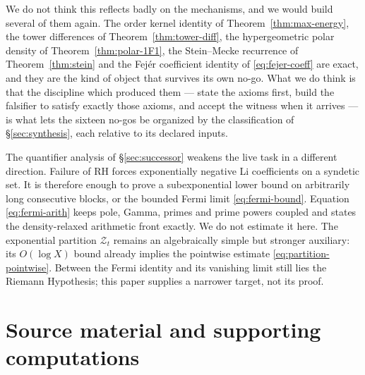 \documentclass[11pt]{amsart}
\theoremstyle{definition}
\theoremstyle{remark}
\theoremstyle{definition}
\begin{document}
We do not think this reflects badly on the mechanisms, and we would build several of them again.
The order kernel identity of Theorem~\ref{thm:max-energy}, the tower differences of
Theorem~\ref{thm:tower-diff}, the hypergeometric polar density of
Theorem~\ref{thm:polar-1F1}, the Stein--Mecke recurrence of Theorem~\ref{thm:stein} and the
Fej\'er coefficient identity of \eqref{eq:fejer-coeff} are exact, and they are the kind of object
that survives its own no-go. What we do think is that the discipline which produced them --- state
the axioms first, build the falsifier to satisfy exactly those axioms, and accept the witness when
it arrives --- is what lets the sixteen no-gos be organized by the classification of
\S\ref{sec:synthesis}, each relative to its declared inputs.

The quantifier analysis of \S\ref{sec:successor} weakens the live task in a different direction.  Failure of RH forces
exponentially negative Li coefficients on a syndetic set.  It is therefore enough to prove a
subexponential lower bound on arbitrarily long consecutive blocks, or the bounded Fermi limit
\eqref{eq:fermi-bound}.  Equation \eqref{eq:fermi-arith} keeps pole, Gamma, primes and prime powers
coupled and states the density-relaxed arithmetic front exactly.  We do not estimate it here.
The exponential partition $\mathcal Z_t$ remains an algebraically simple but stronger auxiliary:
its $O(\log X)$ bound already implies the pointwise estimate \eqref{eq:partition-pointwise}.
Between the Fermi identity and its vanishing limit still lies the Riemann Hypothesis; this paper
supplies a narrower target, not its proof.

\section{Source material and supporting computations}\label{sec:availability}
\end{document}
